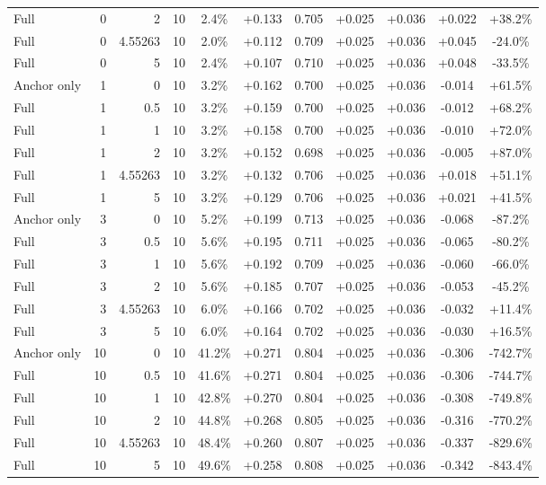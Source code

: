 \begin{table}[htbp]
\begin{tabular}{lrrrccccccc}
Full & 0 & 2 & 10 & 2.4\% & +0.133 & 0.705 & +0.025 & +0.036 & +0.022 & +38.2\% \\
Full & 0 & 4.55263 & 10 & 2.0\% & +0.112 & 0.709 & +0.025 & +0.036 & +0.045 & -24.0\% \\
Full & 0 & 5 & 10 & 2.4\% & +0.107 & 0.710 & +0.025 & +0.036 & +0.048 & -33.5\% \\
Anchor only & 1 & 0 & 10 & 3.2\% & +0.162 & 0.700 & +0.025 & +0.036 & -0.014 & +61.5\% \\
Full & 1 & 0.5 & 10 & 3.2\% & +0.159 & 0.700 & +0.025 & +0.036 & -0.012 & +68.2\% \\
Full & 1 & 1 & 10 & 3.2\% & +0.158 & 0.700 & +0.025 & +0.036 & -0.010 & +72.0\% \\
Full & 1 & 2 & 10 & 3.2\% & +0.152 & 0.698 & +0.025 & +0.036 & -0.005 & +87.0\% \\
Full & 1 & 4.55263 & 10 & 3.2\% & +0.132 & 0.706 & +0.025 & +0.036 & +0.018 & +51.1\% \\
Full & 1 & 5 & 10 & 3.2\% & +0.129 & 0.706 & +0.025 & +0.036 & +0.021 & +41.5\% \\
Anchor only & 3 & 0 & 10 & 5.2\% & +0.199 & 0.713 & +0.025 & +0.036 & -0.068 & -87.2\% \\
Full & 3 & 0.5 & 10 & 5.6\% & +0.195 & 0.711 & +0.025 & +0.036 & -0.065 & -80.2\% \\
Full & 3 & 1 & 10 & 5.6\% & +0.192 & 0.709 & +0.025 & +0.036 & -0.060 & -66.0\% \\
Full & 3 & 2 & 10 & 5.6\% & +0.185 & 0.707 & +0.025 & +0.036 & -0.053 & -45.2\% \\
Full & 3 & 4.55263 & 10 & 6.0\% & +0.166 & 0.702 & +0.025 & +0.036 & -0.032 & +11.4\% \\
Full & 3 & 5 & 10 & 6.0\% & +0.164 & 0.702 & +0.025 & +0.036 & -0.030 & +16.5\% \\
Anchor only & 10 & 0 & 10 & 41.2\% & +0.271 & 0.804 & +0.025 & +0.036 & -0.306 & -742.7\% \\
Full & 10 & 0.5 & 10 & 41.6\% & +0.271 & 0.804 & +0.025 & +0.036 & -0.306 & -744.7\% \\
Full & 10 & 1 & 10 & 42.8\% & +0.270 & 0.804 & +0.025 & +0.036 & -0.308 & -749.8\% \\
Full & 10 & 2 & 10 & 44.8\% & +0.268 & 0.805 & +0.025 & +0.036 & -0.316 & -770.2\% \\
Full & 10 & 4.55263 & 10 & 48.4\% & +0.260 & 0.807 & +0.025 & +0.036 & -0.337 & -829.6\% \\
Full & 10 & 5 & 10 & 49.6\% & +0.258 & 0.808 & +0.025 & +0.036 & -0.342 & -843.4\% \\

\end{tabular}
\end{table}
